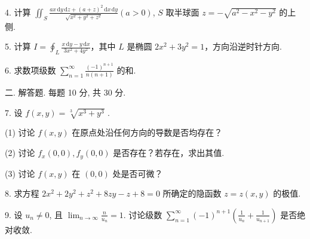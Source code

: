 \documentclass{examcollection}
\begin{document}
{\begin{minipage}{\textwidth}
4. 计算 $\iint_{S} \frac{ax \, \mathrm{d}y \, \mathrm{d}z + (a + z)^2 \, \mathrm{d}x \, \mathrm{d}y}{\sqrt{x^2 + y^2 + z^2}} (a > 0)$, $S$ 取半球面 $z = -\sqrt{a^2 - x^2 - y^2}$ 的上侧.\par
5. 计算 $I = \oint_{L} \frac{x \, \mathrm{d}y - y \, \mathrm{d}x}{3x^2 + 4y^2}$，其中 $L$ 是椭圆 $2x^2 + 3y^2 = 1$，方向沿逆时针方向.\par
6. 求数项级数 $\sum_{n=1}^{\infty} \frac{(-1)^{n+1}}{n(n+1)}$ 的和.\par
二. 解答题. 每题 10 分, 共 30 分.\par
7. 设  $f(x,y)=\sqrt[3]{x^{3}+y^{3}}$ .\par
(1) 讨论 $f(x, y)$ 在原点处沿任何方向的导数是否均存在？\par
(2) 讨论 $f_{x}(0,0), f_{y}(0,0)$ 是否存在？若存在，求出其值.\par
(3) 讨论 $f(x, y)$ 在 $(0, 0)$ 处是否可微？\par
8. 求方程 $2x^{2} + 2y^{2} + z^{2} + 8zy - z + 8 = 0$ 所确定的隐函数 $z = z(x, y)$ 的极值.\par
9. 设 $u_{n} \neq 0$, 且 $\lim_{n \to \infty} \frac{n}{u_n} = 1$. 讨论级数 $\sum_{n=1}^{\infty} (-1)^{n+1} \left( \frac{1}{u_n} + \frac{1}{u_{n+1}} \right)$ 是否绝对收敛.\par
\end{minipage}}
\ifdim\dimexpr\ht\proofbox+\dp\proofbox\relax>\textheight
\noindent\resizebox{!}{\textheight}{\usebox{\proofbox}}\else\noindent\usebox{\proofbox}\fi\clearpage
\end{document}

